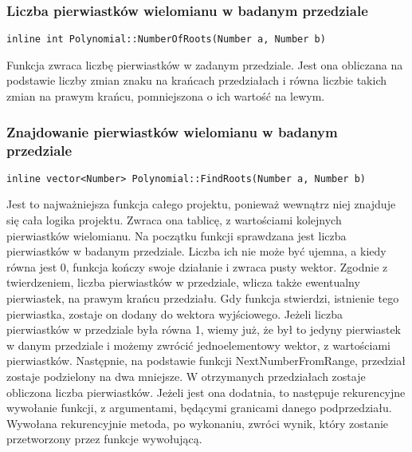 \documentclass[twoside,a4paper]{book}
\begin{document}
\subsubsection{Liczba pierwiastków wielomianu w badanym przedziale}
\begin{lstlisting}
inline int Polynomial::NumberOfRoots(Number a, Number b)
\end{lstlisting}
Funkcja zwraca liczbę pierwiastków w zadanym przedziale. Jest ona obliczana na podstawie liczby zmian znaku na krańcach przedziałach i równa liczbie takich zmian na prawym krańcu, pomniejszona o ich wartość na lewym.

\subsubsection{Znajdowanie pierwiastków wielomianu w badanym przedziale}
\begin{lstlisting}
inline vector<Number> Polynomial::FindRoots(Number a, Number b)
\end{lstlisting}
Jest to najważniejsza funkcja całego projektu, ponieważ wewnątrz niej znajduje się cała logika projektu. Zwraca ona tablicę, z wartościami kolejnych pierwiastków wielomianu.  Na początku funkcji sprawdzana jest liczba pierwiastków w badanym przedziale. Liczba ich nie może być ujemna, a kiedy równa jest 0, funkcja kończy swoje działanie i zwraca pusty wektor.
Zgodnie z twierdzeniem, liczba pierwiastków w przedziale, wlicza także ewentualny pierwiastek, na prawym krańcu przedziału. Gdy funkcja stwierdzi, istnienie tego pierwiastka, zostaje on dodany do wektora wyjściowego. Jeżeli liczba pierwiastków w przedziale była równa 1, wiemy już, że był to jedyny pierwiastek w danym przedziale i możemy zwrócić jednoelementowy wektor, z wartościami pierwiastków.
Następnie, na podstawie funkcji NextNumberFromRange, przedział zostaje podzielony na dwa mniejsze. W otrzymanych przedziałach zostaje obliczona liczba pierwiastków. Jeżeli jest ona dodatnia, to następuje rekurencyjne wywołanie funkcji, z argumentami, będącymi granicami danego podprzedziału. Wywołana rekurencyjnie metoda, po wykonaniu, zwróci wynik, który zostanie przetworzony przez funkcje wywołującą. 



\end{document}
